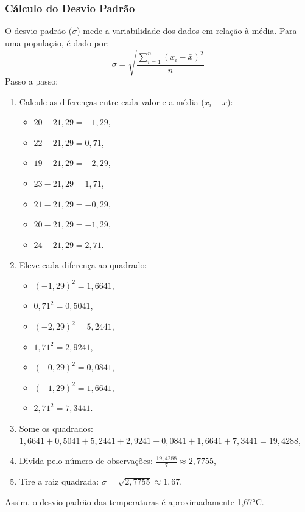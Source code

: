 \documentclass[a4paper,12pt,openany]{book}
\begin{document}
\subsubsection{Cálculo do Desvio Padrão}
O desvio padrão (\(\sigma\)) mede a variabilidade dos dados em relação à média. Para uma população, é dado por:
\begin{equation}
\sigma = \sqrt{\frac{\sum_{i=1}^{n} (x_i - \bar{x})^2}{n}}
\end{equation}
Passo a passo:
\begin{enumerate}
    \item Calcule as diferenças entre cada valor e a média (\(x_i - \bar{x}\)):
    \begin{itemize}
        \item \(20 - 21,29 = -1,29\),
        \item \(22 - 21,29 = 0,71\),
        \item \(19 - 21,29 = -2,29\),
        \item \(23 - 21,29 = 1,71\),
        \item \(21 - 21,29 = -0,29\),
        \item \(20 - 21,29 = -1,29\),
        \item \(24 - 21,29 = 2,71\).
    \end{itemize}
    \item Eleve cada diferença ao quadrado:
    \begin{itemize}
        \item \((-1,29)^2 = 1,6641\),
        \item \(0,71^2 = 0,5041\),
        \item \((-2,29)^2 = 5,2441\),
        \item \(1,71^2 = 2,9241\),
        \item \((-0,29)^2 = 0,0841\),
        \item \((-1,29)^2 = 1,6641\),
        \item \(2,71^2 = 7,3441\).
    \end{itemize}
    \item Some os quadrados: \(1,6641 + 0,5041 + 5,2441 + 2,9241 + 0,0841 + 1,6641 + 7,3441 = 19,4288\),
    \item Divida pelo número de observações: \(\frac{19,4288}{7} \approx 2,7755\),
    \item Tire a raiz quadrada: \(\sigma = \sqrt{2,7755} \approx 1,67\).
\end{enumerate}

Assim, o desvio padrão das temperaturas é aproximadamente 1,67°C.
\end{document}
